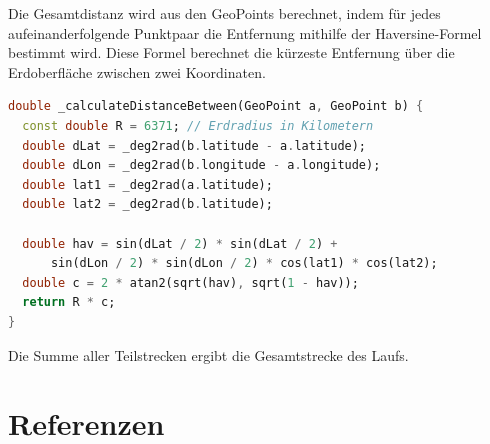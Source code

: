 \documentclass[11pt,a4paper]{article}
\begin{document}
Die Gesamtdistanz wird aus den GeoPoints berechnet, indem für jedes aufeinanderfolgende Punktpaar die Entfernung mithilfe der Haversine-Formel bestimmt wird. Diese Formel berechnet die kürzeste Entfernung über die Erdoberfläche zwischen zwei Koordinaten.

\begin{lstlisting}[language=Dart, caption=Berechnung der Entfernung zweier GeoPoints]
double _calculateDistanceBetween(GeoPoint a, GeoPoint b) {
  const double R = 6371; // Erdradius in Kilometern
  double dLat = _deg2rad(b.latitude - a.latitude);
  double dLon = _deg2rad(b.longitude - a.longitude);
  double lat1 = _deg2rad(a.latitude);
  double lat2 = _deg2rad(b.latitude);

  double hav = sin(dLat / 2) * sin(dLat / 2) +
      sin(dLon / 2) * sin(dLon / 2) * cos(lat1) * cos(lat2);
  double c = 2 * atan2(sqrt(hav), sqrt(1 - hav));
  return R * c;
}
\end{lstlisting}

Die Summe aller Teilstrecken ergibt die Gesamtstrecke des Laufs.

\newpage
\section{Referenzen}
\end{document}
